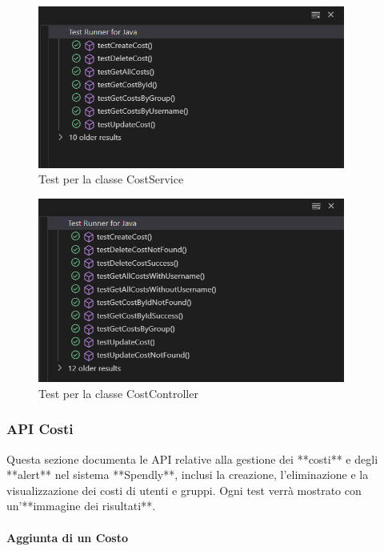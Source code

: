 \begin{figure}[H]
    \centering
    \includegraphics[width=0.9\textwidth]{images/CostServiceTest_iter2.png}
    \caption{Test per la classe CostService}
    \label{fig:CostServiceTest_iter2}
\end{figure}

\begin{figure}[H]
    \centering
    \includegraphics[width=0.9\textwidth]{images/CostControllerTest_iter2.png}
    \caption{Test per la classe CostController}
    \label{fig:CostControllerTest_iter2}
\end{figure}



\subsubsection{API Costi}

Questa sezione documenta le API relative alla gestione dei **costi** e degli **alert**  nel sistema **Spendly**, inclusi la creazione, l'eliminazione e la visualizzazione dei costi di utenti e gruppi. Ogni test verrà mostrato con un'**immagine dei risultati**.

\paragraph{Aggiunta di un Costo}  

